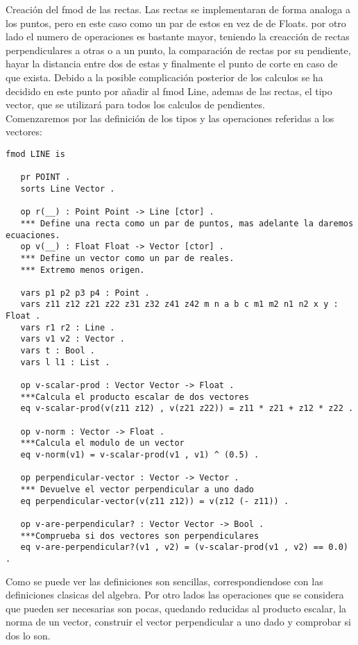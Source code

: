 \documentclass[12pt,a4paper]{book}
\begin{document}
Creaci\'on del fmod de las rectas. Las rectas se implementaran de forma analoga a los puntos, pero en este caso como un par de estos en vez de de Floats. por otro lado el numero de operaciones es bastante mayor, teniendo la creacci\'on de rectas perpendiculares a otras o a un punto, la comparaci\'on de rectas por su pendiente, hayar la distancia entre dos de estas y finalmente el punto de corte en caso de que exista. Debido a la posible complicaci\'on posterior de los calculos se ha decidido en este punto por añadir al fmod Line, ademas de las rectas, el tipo vector, que se utilizar\'a para todos los calculos de pendientes. \\

Comenzaremos por las definici\'on de los tipos y las operaciones referidas a los vectores: \par

\begin{verbatim}
fmod LINE is 

   pr POINT .
   sorts Line Vector .

   op r(__) : Point Point -> Line [ctor] .
   *** Define una recta como un par de puntos, mas adelante la daremos ecuaciones.
   op v(__) : Float Float -> Vector [ctor] .
   *** Define un vector como un par de reales.
   *** Extremo menos origen.

   vars p1 p2 p3 p4 : Point .
   vars z11 z12 z21 z22 z31 z32 z41 z42 m n a b c m1 m2 n1 n2 x y : Float .
   vars r1 r2 : Line .
   vars v1 v2 : Vector .
   vars t : Bool .
   vars l l1 : List .

   op v-scalar-prod : Vector Vector -> Float .
   ***Calcula el producto escalar de dos vectores
   eq v-scalar-prod(v(z11 z12) , v(z21 z22)) = z11 * z21 + z12 * z22 .

   op v-norm : Vector -> Float .
   ***Calcula el modulo de un vector
   eq v-norm(v1) = v-scalar-prod(v1 , v1) ^ (0.5) .

   op perpendicular-vector : Vector -> Vector .
   *** Devuelve el vector perpendicular a uno dado
   eq perpendicular-vector(v(z11 z12)) = v(z12 (- z11)) .

   op v-are-perpendicular? : Vector Vector -> Bool .
   ***Comprueba si dos vectores son perpendiculares
   eq v-are-perpendicular?(v1 , v2) = (v-scalar-prod(v1 , v2) == 0.0) .

\end{verbatim}

Como se puede ver las definiciones son sencillas, correspondiendose con las definiciones clasicas del algebra. 
Por otro lados las operaciones que se considera que pueden ser necesarias son pocas, quedando reducidas al producto escalar, la norma de un vector, construir el vector perpendicular a uno dado y comprobar si dos lo son. \\
\end{document}
